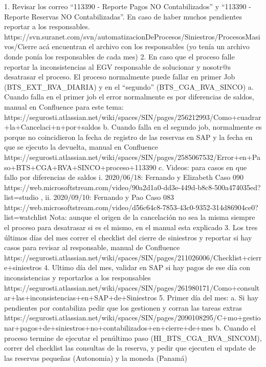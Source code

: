 	1. Revisar los correo “113390 - Reporte Pagos NO Contabilizados” y “113390 - Reporte Reservas NO Contabilizadas”. En caso de haber muchos pendientes reportar a los responsables. https://svn.suranet.com/svn/automatizacionDeProcesos/Siniestros/ProcesosMasivos/Cierre acá encuentran el archivo con los responsables (yo tenía un archivo donde ponía los responsables de cada mes)
	2. En caso que el proceso falle reportar la inconsistencias al EGV responsable de solucionar y nosotr@s desatrasar el proceso. El proceso normalmente puede fallar en primer Job (BTS_EXT_RVA_DIARIA)  y en el “segundo” (BTS_CGA_RVA_SINCO)
		a. Cuando falla en el primer job el error normalmente es por diferencias de saldos, manual en Confluence para este tema: https://segurosti.atlassian.net/wiki/spaces/SIN/pages/256212993/Como+cuadrar+la+Cancelaci+n+por+saldos
		b. Cuando falla en el segundo job, normalmente es porque no coincidieron la fecha de registro de las reservas en SAP y la fecha en que se ejecuto la devuelta, manual en Confluence https://segurosti.atlassian.net/wiki/spaces/SIN/pages/2585067532/Error+en+Paso+BTS+CGA+RVA+SINCO+proceso+113390
		c. Videos: para casos en que fallo por diferencias de saldos
                                                    i.     2020/06/18: Fernando y Elizabeth Caso 090  https://web.microsoftstream.com/video/90a2d1a0-dd3e-449d-b8c8-500a474035ed?list=studio ,
                                                   ii.     2020/09/10: Fernando y Pao Caso 083   https://web.microsoftstream.com/video/d56c64c8-7853-43c0-9352-314d86904ce0?list=watchlist
		Nota: aunque el origen de la cancelación no sea la misma siempre el proceso para desatrasar si es el mismo, en el manual esta explicado
	3. Los tres últimos días del mes correr el checklist del cierre de siniestros y reportar si hay casos para revisar al responsable, manual de Confluence https://segurosti.atlassian.net/wiki/spaces/SIN/pages/211026006/Checklist+cierre+siniestros
	4. Ultimo día del mes, validar en SAP si hay pagos de ese día con inconsistencias y reportarlos a los responsables https://segurosti.atlassian.net/wiki/spaces/SIN/pages/261980171/Como+consultar+las+inconsistencias+en+SAP+de+Siniestros
	5. Primer día del mes:
		a. Si hay pendientes por contabiliza pedir que los gestionen y corran las tareas extras https://segurosti.atlassian.net/wiki/spaces/SIN/pages/2090108295/C+mo+gestionar+pagos+de+siniestros+no+contabilizados+en+cierre+de+mes
		b. Cuando el proceso termine de ejecutar el penúltimo paso (HI_BTS_CGA_RVA_SINCOM), correr del checklist las consultas de la reserva, y pedir que ejecuten el update de las reservas pequeñas (Autonomia) y la moneda (Panamá)

